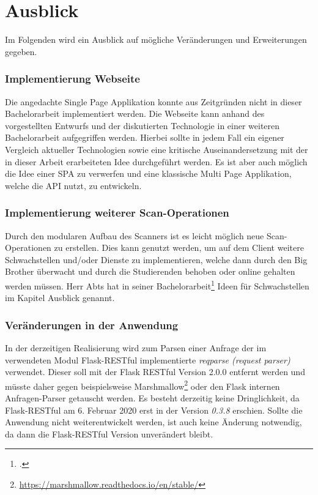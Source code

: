 \newpage
\section{Ausblick}
\label{sec:Ausblick}
Im Folgenden wird ein Ausblick auf mögliche Veränderungen und Erweiterungen gegeben.

\subsubsection{Implementierung Webseite}
Die angedachte Single Page Applikation konnte aus Zeitgründen nicht in dieser Bachelorarbeit implementiert werden. Die Webseite kann anhand des vorgestellten Entwurfs und der diskutierten Technologie in einer weiteren Bachelorarbeit aufgegriffen werden. Hierbei sollte in jedem Fall ein eigener Vergleich aktueller Technologien sowie eine kritische Auseinandersetzung mit der in dieser Arbeit erarbeiteten Idee durchgeführt werden. Es ist aber auch möglich die Idee einer SPA zu verwerfen und eine klassische Multi Page Applikation, welche die API nutzt, zu entwickeln.

\subsubsection{Implementierung weiterer Scan-Operationen}
Durch den modularen Aufbau des Scanners ist es leicht möglich neue Scan-Operationen zu erstellen. Dies kann genutzt werden, um auf dem Client weitere Schwachstellen und/oder Dienste zu implementieren, welche dann durch den Big Brother überwacht und durch die Studierenden behoben oder online gehalten werden müssen. Herr Abts hat in seiner Bachelorarbeit\footcite{abtsUeberarbeitungUndErweiterung2016} Ideen für Schwachstellen im Kapitel Ausblick genannt. 

\subsubsection{Veränderungen in der Anwendung}
In der derzeitigen Realisierung wird zum Parsen einer Anfrage der im verwendeten Modul Flask-RESTful implementierte \textit{reqparse (request parser)} verwendet. Dieser soll mit der Flask RESTful Version 2.0.0 entfernt werden und müsste daher gegen beispielsweise Marshmallow\footnote{\url{https://marshmallow.readthedocs.io/en/stable/}} oder den Flask internen Anfragen-Parser getauscht werden. Es besteht derzeitig keine Dringlichkeit, da Flask-RESTful am 6. Februar 2020 erst in der Version \textit{0.3.8} erschien. Sollte die Anwendung nicht weiterentwickelt werden, ist auch keine Änderung notwendig, da dann die Flask-RESTful Version unverändert bleibt.


